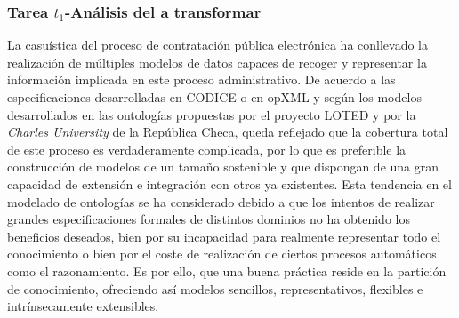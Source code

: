 \subsubsection{Tarea $t_1$-Análisis del \dataset a transformar}\label{t1-ppn}
La casuística del proceso de contratación pública electrónica ha conllevado la realización 
de múltiples modelos de datos capaces de recoger y representar la información implicada 
en este proceso administrativo. De acuerdo a las especificaciones desarrolladas en \gls{CODICE} o en 
\gls{opXML} y según los modelos desarrollados en las ontologías propuestas por el proyecto LOTED 
y por la \textit{Charles University} de la República Checa, queda reflejado que la cobertura total 
de este proceso es verdaderamente complicada, por lo que es preferible la construcción 
de modelos de un tamaño sostenible y que dispongan de una gran capacidad de extensión 
e integración con otros ya existentes. Esta tendencia en el modelado de ontologías 
se ha considerado debido a que los intentos de realizar grandes especificaciones formales 
de distintos dominios no ha obtenido los beneficios deseados, bien por su incapacidad para 
realmente representar todo el conocimiento o bien por el coste de realización de ciertos 
procesos automáticos como el razonamiento. Es por ello, que una buena práctica reside 
en la partición de conocimiento, ofreciendo así modelos sencillos, representativos, flexibles 
e intrínsecamente extensibles.


